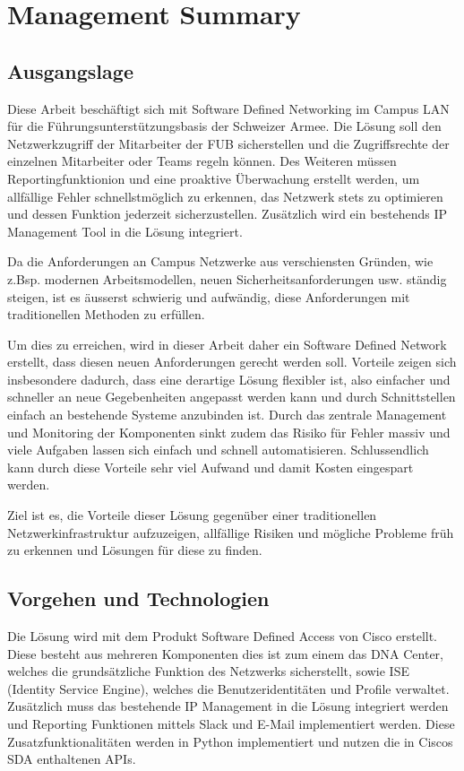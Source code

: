 \section{Management Summary}

\subsection{Ausgangslage}
Diese Arbeit beschäftigt sich mit Software Defined Networking im Campus LAN für die Führungsunterstützungsbasis der Schweizer Armee. Die Lösung soll den Netzwerkzugriff der Mitarbeiter der FUB sicherstellen und die Zugriffsrechte der einzelnen Mitarbeiter oder Teams regeln können. 
Des Weiteren müssen Reportingfunktionion und eine proaktive Überwachung erstellt werden, um allfällige Fehler schnellstmöglich zu erkennen, das Netzwerk stets zu optimieren und dessen Funktion jederzeit sicherzustellen.
Zusätzlich wird ein bestehends IP Management Tool in die Lösung integriert.

Da die Anforderungen an Campus Netzwerke aus verschiensten Gründen, wie z.Bsp. modernen Arbeitsmodellen, neuen Sicherheitsanforderungen usw. ständig steigen, ist es äusserst schwierig und aufwändig, diese Anforderungen mit traditionellen Methoden zu erfüllen. 

Um dies zu erreichen, wird in dieser Arbeit daher ein Software Defined Network erstellt, dass diesen neuen Anforderungen gerecht werden soll. Vorteile zeigen sich insbesondere dadurch, dass eine derartige Lösung flexibler ist, also einfacher und schneller an neue Gegebenheiten angepasst werden kann und durch Schnittstellen einfach an bestehende Systeme anzubinden ist. Durch das zentrale Management und Monitoring der Komponenten sinkt zudem das Risiko für Fehler massiv und viele Aufgaben lassen sich einfach und schnell automatisieren.
Schlussendlich kann durch diese Vorteile sehr viel Aufwand und damit Kosten eingespart werden.

Ziel ist es, die Vorteile dieser Lösung gegenüber einer traditionellen Netzwerkinfrastruktur aufzuzeigen, allfällige Risiken und mögliche Probleme früh zu erkennen und Lösungen für diese zu finden. 
\subsection{Vorgehen und Technologien}
Die Lösung wird mit dem Produkt Software Defined Access von Cisco erstellt. Diese besteht aus mehreren Komponenten dies ist zum einem das DNA Center, welches die grundsätzliche Funktion des Netzwerks sicherstellt, sowie ISE (Identity Service Engine), welches die Benutzeridentitäten und Profile verwaltet.
Zusätzlich muss das bestehende IP Management in die Lösung integriert werden und Reporting Funktionen mittels Slack und E-Mail implementiert werden. Diese Zusatzfunktionalitäten werden in Python implementiert und nutzen die in Ciscos SDA enthaltenen APIs.
